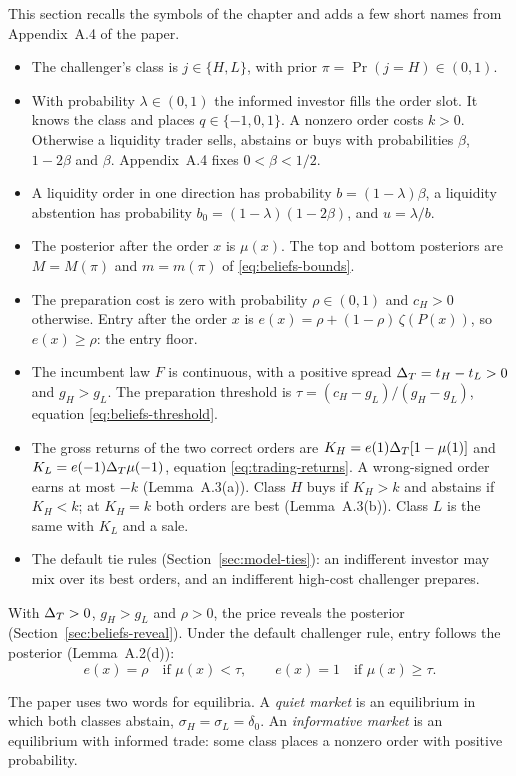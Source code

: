 This section recalls the symbols of the chapter and adds a few short names from Appendix~A.4 of the paper.
\begin{itemize}
\item The challenger's class is \(j\in\{H,L\}\), with prior \(\pi=\Pr(j=H)\in(0,1)\).
\item With probability \(\lambda\in(0,1)\) the informed investor fills the order slot. It knows the class and places
\(q\in\{-1,0,1\}\). A nonzero order costs \(k>0\). Otherwise a liquidity trader sells, abstains or buys with
probabilities \(\beta\), \(1-2\beta\) and \(\beta\). Appendix~A.4 fixes \(0<\beta<1/2\).
\item A liquidity order in one direction has probability \(b=(1-\lambda)\beta\), a liquidity abstention has
probability \(b_0=(1-\lambda)(1-2\beta)\), and \(u=\lambda/b\).
\item The posterior after the order \(x\) is \(\mu(x)\). The top and bottom posteriors are \(M=M(\pi)\) and
\(m=m(\pi)\) of \eqref{eq:beliefs-bounds}.
\item The preparation cost is zero with probability \(\rho\in(0,1)\) and \(c_H>0\) otherwise. Entry after the order
\(x\) is \(e(x)=\rho+(1-\rho)\,\zeta(P(x))\), so \(e(x)\ge\rho\): the entry floor.
\item The incumbent law \(F\) is continuous, with a positive spread \(\Delta_T=t_H-t_L>0\) and \(g_H>g_L\). The
preparation threshold is \(\tau=(c_H-g_L)/(g_H-g_L)\), equation \eqref{eq:beliefs-threshold}.
\item The gross returns of the two correct orders are \(K_H=e(1)\Delta_T[1-\mu(1)]\) and \(K_L=e(-1)\Delta_T\mu(-1)\),
equation \eqref{eq:trading-returns}. A wrong-signed order earns at most \(-k\) (Lemma~A.3(a)). Class \(H\) buys if
\(K_H>k\) and abstains if \(K_H<k\); at \(K_H=k\) both orders are best (Lemma~A.3(b)). Class \(L\) is the same with
\(K_L\) and a sale.
\item The default tie rules (Section~\ref{sec:model-ties}): an indifferent investor may mix over its best orders,
and an indifferent high-cost challenger prepares.
\end{itemize}

With \(\Delta_T>0\), \(g_H>g_L\) and \(\rho>0\), the price reveals the posterior (Section~\ref{sec:beliefs-reveal}). Under
the default challenger rule, entry follows the posterior (Lemma~A.2(d)):
\[
e(x)=\rho\quad\text{if }\mu(x)<\tau,\qquad e(x)=1\quad\text{if }\mu(x)\ge\tau .
\]

The paper uses two words for equilibria. A \emph{quiet market} is an equilibrium in which both classes abstain,
\(\sigma_H=\sigma_L=\delta_0\). An \emph{informative market} is an equilibrium with informed trade: some class places
a nonzero order with positive probability.

